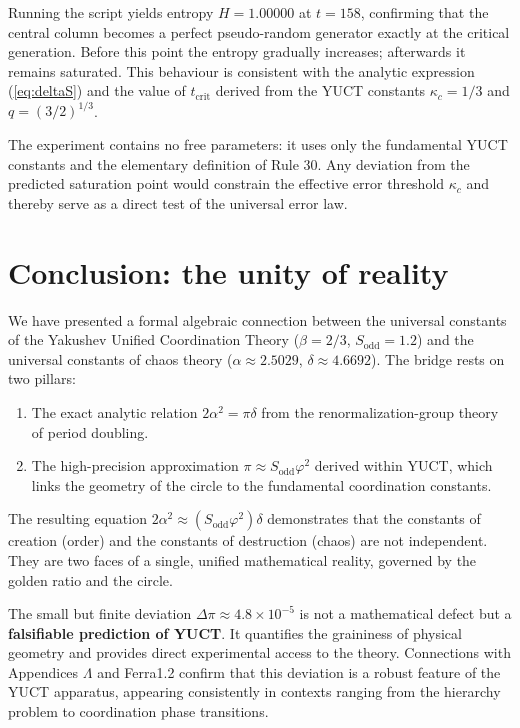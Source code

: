 \documentclass[11pt,a4paper]{article}
\begin{document}
	Running the script yields entropy \(H = 1.00000\) at \(t = 158\), confirming that the central column becomes a perfect pseudo-random generator exactly at the critical generation. Before this point the entropy gradually increases; afterwards it remains saturated. This behaviour is consistent with the analytic expression (\ref{eq:deltaS}) and the value of \(t_{\mathrm{crit}}\) derived from the YUCT constants \(\kappa_c = 1/3\) and \(q = (3/2)^{1/3}\).
	
	The experiment contains no free parameters: it uses only the fundamental YUCT constants and the elementary definition of Rule 30. Any deviation from the predicted saturation point would constrain the effective error threshold \(\kappa_c\) and thereby serve as a direct test of the universal error law.
	
	\section{Conclusion: the unity of reality}
	
	We have presented a formal algebraic connection between the universal constants of the Yakushev Unified Coordination Theory (\(\beta = 2/3\), \(S_{\mathrm{odd}} = 1.2\)) and the universal constants of chaos theory (\(\alpha \approx 2.5029\), \(\delta \approx 4.6692\)). The bridge rests on two pillars:
	\begin{enumerate}
		\item The exact analytic relation \(2\alpha^2 = \pi \delta\) from the renormalization-group theory of period doubling.
		\item The high-precision approximation \(\pi \approx S_{\mathrm{odd}}\varphi^2\) derived within YUCT, which links the geometry of the circle to the fundamental coordination constants.
	\end{enumerate}
	
	The resulting equation \(2\alpha^2 \approx (S_{\mathrm{odd}}\varphi^2)\delta\) demonstrates that the constants of creation (order) and the constants of destruction (chaos) are not independent. They are two faces of a single, unified mathematical reality, governed by the golden ratio and the circle.
	
	The small but finite deviation \(\Delta\pi \approx 4.8\times10^{-5}\) is not a mathematical defect but a \textbf{falsifiable prediction of YUCT}. It quantifies the graininess of physical geometry and provides direct experimental access to the theory. Connections with Appendices \(\Lambda\) and Ferra1.2 confirm that this deviation is a robust feature of the YUCT apparatus, appearing consistently in contexts ranging from the hierarchy problem to coordination phase transitions.
	
\end{document}
